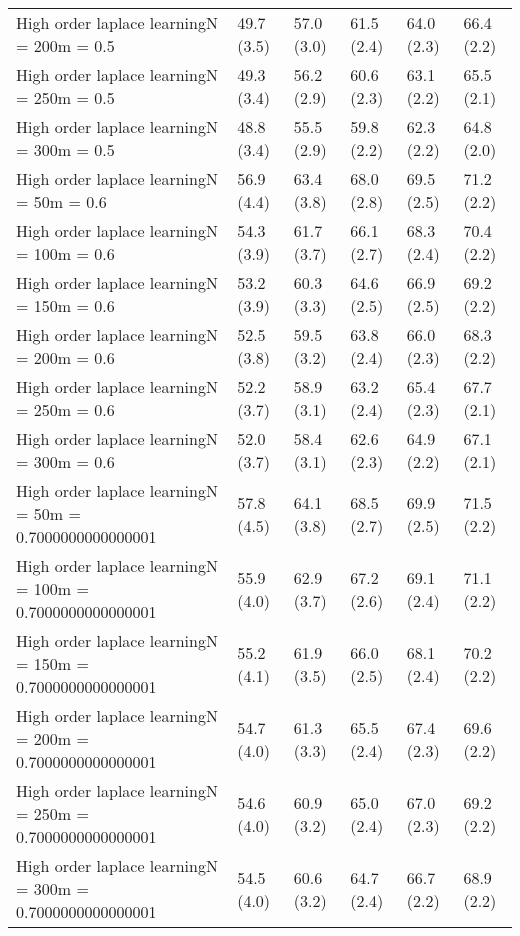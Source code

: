 \documentclass{article}
\begin{document}
\begin{table*}[t!]
\begin{center}
\begin{small}
\begin{sc}
\begin{tabular}{llllll}
High order laplace learningN = 200m = 0.5&49.7 (3.5)      &57.0 (3.0)      &61.5 (2.4)      &64.0 (2.3)      &66.4 (2.2)      \\
High order laplace learningN = 250m = 0.5&49.3 (3.4)      &56.2 (2.9)      &60.6 (2.3)      &63.1 (2.2)      &65.5 (2.1)      \\
High order laplace learningN = 300m = 0.5&48.8 (3.4)      &55.5 (2.9)      &59.8 (2.2)      &62.3 (2.2)      &64.8 (2.0)      \\
High order laplace learningN = 50m = 0.6&56.9 (4.4)      &63.4 (3.8)      &68.0 (2.8)      &69.5 (2.5)      &71.2 (2.2)      \\
High order laplace learningN = 100m = 0.6&54.3 (3.9)      &61.7 (3.7)      &66.1 (2.7)      &68.3 (2.4)      &70.4 (2.2)      \\
High order laplace learningN = 150m = 0.6&53.2 (3.9)      &60.3 (3.3)      &64.6 (2.5)      &66.9 (2.5)      &69.2 (2.2)      \\
High order laplace learningN = 200m = 0.6&52.5 (3.8)      &59.5 (3.2)      &63.8 (2.4)      &66.0 (2.3)      &68.3 (2.2)      \\
High order laplace learningN = 250m = 0.6&52.2 (3.7)      &58.9 (3.1)      &63.2 (2.4)      &65.4 (2.3)      &67.7 (2.1)      \\
High order laplace learningN = 300m = 0.6&52.0 (3.7)      &58.4 (3.1)      &62.6 (2.3)      &64.9 (2.2)      &67.1 (2.1)      \\
High order laplace learningN = 50m = 0.7000000000000001&57.8 (4.5)      &64.1 (3.8)      &68.5 (2.7)      &69.9 (2.5)      &71.5 (2.2)      \\
High order laplace learningN = 100m = 0.7000000000000001&55.9 (4.0)      &62.9 (3.7)      &67.2 (2.6)      &69.1 (2.4)      &71.1 (2.2)      \\
High order laplace learningN = 150m = 0.7000000000000001&55.2 (4.1)      &61.9 (3.5)      &66.0 (2.5)      &68.1 (2.4)      &70.2 (2.2)      \\
High order laplace learningN = 200m = 0.7000000000000001&54.7 (4.0)      &61.3 (3.3)      &65.5 (2.4)      &67.4 (2.3)      &69.6 (2.2)      \\
High order laplace learningN = 250m = 0.7000000000000001&54.6 (4.0)      &60.9 (3.2)      &65.0 (2.4)      &67.0 (2.3)      &69.2 (2.2)      \\
High order laplace learningN = 300m = 0.7000000000000001&54.5 (4.0)      &60.6 (3.2)      &64.7 (2.4)      &66.7 (2.2)      &68.9 (2.2)      \\

\end{tabular}
\end{sc}
\end{small}
\end{center}
\end{table*}
\end{document}
